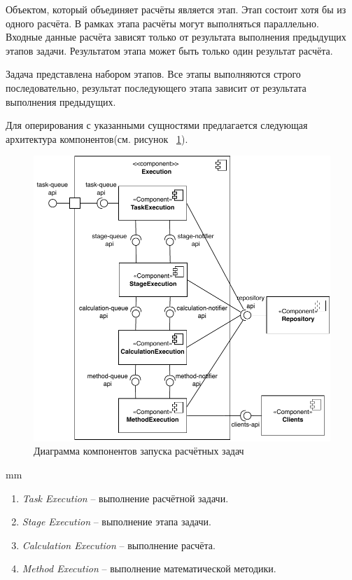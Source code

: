Объектом, который объединяет расчёты является этап. Этап состоит хотя бы из одного расчёта. В рамках этапа
расчёты могут выполняться параллельно. Входные данные расчёта зависят только от результата выполнения предыдущих этапов
задачи. Результатом этапа может быть только один результат расчёта.

Задача представлена набором этапов. Все этапы выполняются строго последовательно, результат последующего этапа
зависит от результата выполнения предыдущих.

Для оперирования с указанными сущностями предлагается следующая архитектура
компонентов(см. рисунок \ \ref{pic:architecture__orchestrator-detailed-component}).

\begin{figure}[H]
	\includegraphics[width=\textwidth]{architecture/pictures/orchestrator/component_detailed}
	\caption{Диаграмма компонентов запуска расчётных задач}
	\label{pic:architecture__orchestrator-detailed-component}
\end{figure}
 mm

\begin{enumerate}
	\item {
		\textit{Task Execution} -- выполнение расчётной задачи.
	}
	\item {
		\textit{Stage Execution} -- выполнение этапа задачи.
	}
	\item {
		\textit{Calculation Execution} -- выполнение расчёта.
	}
	\item {
		\textit{Method Execution} -- выполнение математической методики.
	}
\end{enumerate}

